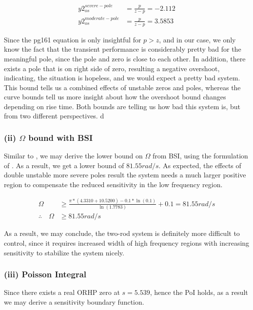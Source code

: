 \documentclass{tron}
\begin{document}
\begin{align}
	y2_{os}^{severe-pole} & = \frac{p}{z - p} = -2.112 \\
	y2_{os}^{moderate-pole} & = \frac{p}{z - p} = 3.5853
\end{align}

Since the pg161 equation is only insightful for $p>z$, and in our case, we only know the fact that the transient performance is considerably pretty bad for the meaningful pole, since the pole and zero is close to each other. In addition, there exists a pole that is on right side of zero, resulting a negative overshoot, indicating, the situation is hopeless, and we would expect a pretty bad system. This bound tells us a combined effects of unstable zeros and poles, whereas the curve bounds tell us more insight about how the overshoot bound changes depending on rise time. Both bounds are telling us how bad this system is, but from two different perspectives.
d

\newpage
\subsubsection{(ii) $\Omega$ bound with \Gls{BSI}}
Similar to , we may derive the lower bound on $\Omega$ from \Gls{BSI}, using the formulation of . As a result, we get a lower bound of $81.55 \unit{rad/s}$. As expected, the effects of double unstable more severe poles result the system needs a much larger positive region to compensate the reduced sensitivity in the low frequency region.

\begin{align}
	\Omega & \geq \frac{\pi * (4.3310 + 10.5200) - 0.1 * \ln(0.1)}{\ln(1.7783)} + 0.1 = 81.55 \unit{rad/s}\\
	\therefore\quad \Omega & \geq 81.55 \unit{rad/s}
\end{align}

As a result, we may conclude, the two-rod system is definitely more difficult to control, since it requires increased width of high frequency regions with increasing sensitivity to stabilize the system nicely.

\subsubsection{(iii) Poisson Integral}
Since there exists a real \Gls{ORHP} zero at $s=5.539$, hence the \Gls{PoI} holds, as a result we may derive a sensitivity boundary function. 
\end{document}
